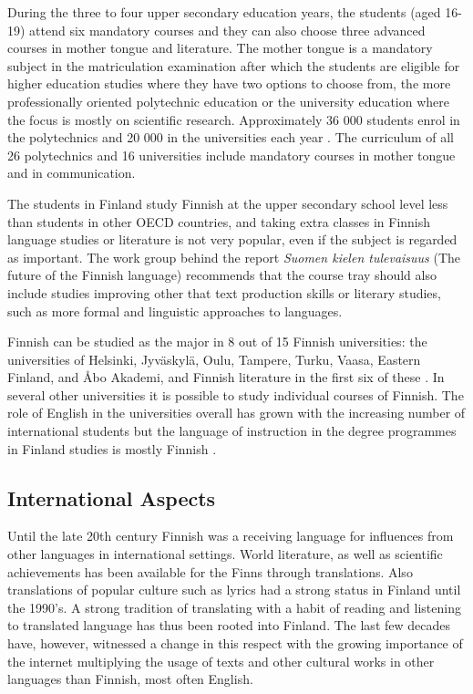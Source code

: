 \documentclass[]{../../metanetpaper}
\begin{document}
\begin{multicols}{2}
During the three to four upper secondary education years, the
students (aged 16-19) attend six mandatory courses and they can also
choose three advanced courses in mother tongue and literature. The
mother tongue is a mandatory subject in the matriculation examination
after which the students are eligible for higher education studies
where they have two options to choose from, the more professionally
oriented polytechnic education or the university education where the
focus is mostly on scientific research. Approximately 36 000 students
enrol in the polytechnics and 20 000 in the universities each year
\cite{Education}. The curriculum of all 26 polytechnics and 16
universities include mandatory courses in mother tongue and in
communication.

The students in Finland study Finnish at the upper secondary
school level less than students in other OECD countries, and
taking extra classes in Finnish language studies or literature is not very
popular, even if the subject is regarded as important. The work group behind the report
\textit{\foreignlanguage{finnish}{Suomen kielen tulevaisuus}} (The
future of the Finnish language) \cite{Tulevaisuus2009} recommends that
the course tray should also include studies improving other that text
production skills or literary studies, such as more formal and linguistic
approaches to languages.

Finnish can be studied as the major in 8 out of 15 Finnish
universities: the universities of Helsinki, Jyväskylä, Oulu, Tampere,
Turku, Vaasa, Eastern Finland, and Åbo Akademi, and Finnish literature
in the first six of these \cite{hum-ulko}. In several other
universities it is possible to study individual courses of
Finnish. The role of English in the universities overall has grown
with the increasing number of international students but the language
of instruction in the degree programmes in Finland studies is mostly
Finnish \cite{Board}.

\subsection{International Aspects}

Until the late 20th century Finnish was a receiving language for
influences from other languages in international settings. World
literature, as well as scientific achievements has been available for
the Finns through translations. Also translations of popular
culture such as lyrics had a strong status in Finland until the
1990's. A strong tradition of translating with a habit of reading and
listening to translated language has thus been rooted into Finland.
The last few decades have, however, witnessed a change in this respect
with the growing importance of the internet multiplying the usage of
texts and other cultural works in other languages than Finnish, most
often English.


\end{multicols}
\end{document}
